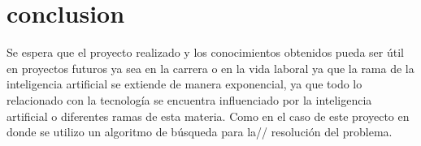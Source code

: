 \documentclass[12pts]{article}
\begin{document}
\section{conclusion}
Se espera que el proyecto realizado y los conocimientos obtenidos pueda ser útil en proyectos futuros ya sea en la carrera o en la vida laboral ya que la rama de la inteligencia artificial se extiende de manera exponencial,  ya que todo lo relacionado con la tecnología se encuentra influenciado por la inteligencia artificial o diferentes ramas de esta materia.
Como en el caso de este proyecto en donde se utilizo un algoritmo de búsqueda para la// resolución del problema.
\end{document}
